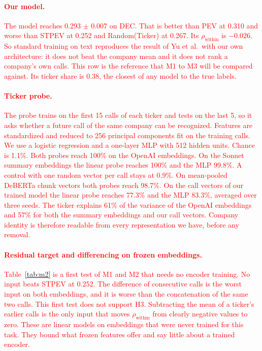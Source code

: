 \documentclass{article}
\newcommand{\new}[1]{\textcolor{red}{#1}}
\begin{document}
\paragraph{\new{Our model.}}
\new{The model reaches 0.293 $\pm$ 0.007 on DEC. That is better than PEV at 0.310 and worse than STPEV at 0.252 and Random(Ticker) at 0.267. Its $\rho_{\text{within}}$ is $-0.026$. So standard training on text reproduces the result of Yu et al.\ with our own architecture: it does not beat the company mean and it does not rank a company's own calls. This row is the reference that M1 to M3 will be compared against.} \new{Its ticker share is 0.38, the closest of any model to the true labels.}

\paragraph{\new{Ticker probe.}}
\new{The probe trains on the first 15 calls of each ticker and tests on the last 5, so it asks whether a future call of the same company can be recognized. Features are standardized and reduced to 256 principal components fit on the training calls. We use a logistic regression and a one-layer MLP with 512 hidden units. Chance is 1.1\%. Both probes reach 100\% on the OpenAI embeddings. On the Sonnet summary embeddings the linear probe reaches 100\% and the MLP 99.8\%. A control with one random vector per call stays at 0.9\%. On mean-pooled DeBERTa chunk vectors both probes reach 98.7\%. On the call vectors of our trained model the linear probe reaches 77.3\% and the MLP 83.3\%, averaged over three seeds. The ticker explains 61\% of the variance of the OpenAI embeddings and 57\% for both the summary embeddings and our call vectors. Company identity is therefore readable from every representation we have, before any removal.}

\paragraph{\new{Residual target and differencing on frozen embeddings.}}
\new{Table~\ref{tab:m2} is a first test of M1 and M2 that needs no encoder training. No input beats STPEV at 0.252. The difference of consecutive calls is the worst input on both embeddings, and it is worse than the concatenation of the same two calls. This first test does not support H3. Subtracting the mean of a ticker's earlier calls is the only input that moves $\rho_{\text{within}}$ from clearly negative values to zero. These are linear models on embeddings that were never trained for this task. They bound what frozen features offer and say little about a trained encoder.}
\end{document}
